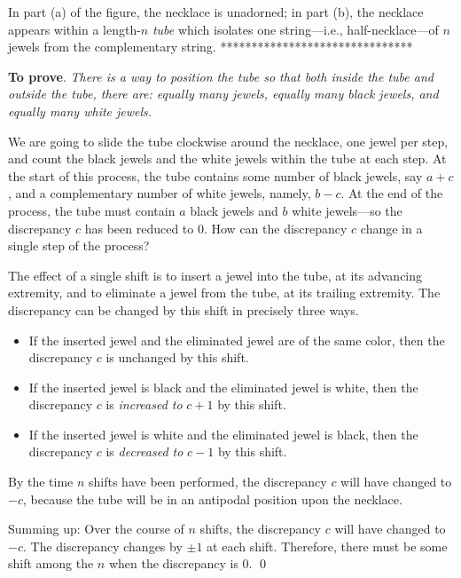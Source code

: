 \begin{itemize}
{In part (a) of the figure, the necklace is unadorned; in part (b), the necklace appears within a length-$n$ {\it tube} which isolates one string---i.e., half-necklace---of $n$ jewels from the complementary string.
*******************************}
\smallskip

{\bf To prove}.
{\em There is a way to position the tube so that both inside the tube and outside the tube, there are: equally many jewels, equally many black jewels, and equally many white jewels.} 

\medskip

We are going to slide the tube clockwise around the necklace, one jewel per step, and count the black jewels and the white jewels within the tube at each step.  At the start of this process, the tube contains some number of black jewels, say $a+c$, and a complementary number of white jewels, namely, $b-c$.  At the end of the process, the tube must contain $a$ black jewels and $b$ white jewels---so the discrepancy $c$ has been reduced to $0$.  How can the discrepancy $c$ change in a single step of the process?

\smallskip

The effect of a single shift is to insert a jewel into the tube, at its advancing extremity, and to eliminate a jewel from the tube, at its trailing extremity.  The discrepancy can be changed by this shift in precisely three ways.
  \begin{itemize}
  \item
If the inserted jewel and the eliminated jewel are of the same color, then the discrepancy $c$ 
is unchanged by this shift.
  \medskip\item
If the inserted jewel is black and the eliminated jewel is white, then the discrepancy $c$ is {\em increased to} $c+1$ by this shift. 
  \medskip\item
If the inserted jewel is white and the eliminated jewel is black, then the discrepancy $c$ is {\em decreased to} $c-1$ by this shift. 
  \end{itemize}
By the time $n$ shifts have been performed, the discrepancy $c$ will have changed to $-c$, because the tube will be in an antipodal position upon the necklace.

\smallskip

Summing up: Over the course of $n$ shifts, the discrepancy $c$ will have changed to $-c$.  The  discrepancy changes by $\pm 1$ at each shift.  Therefore, there must be some shift among the $n$ when the discrepancy is $0$.  \qed
 


\end{itemize}
